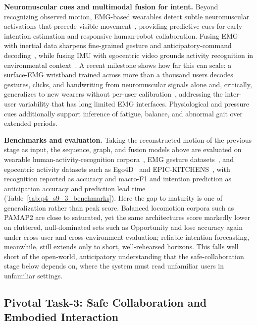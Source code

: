 \textbf{Neuromuscular cues and multimodal fusion for intent.} Beyond recognizing observed motion, EMG-based wearables detect subtle neuromuscular activations that precede visible movement~\cite{atzori2014ninapro}, providing predictive cues for early intention estimation and responsive human-robot collaboration.
Fusing EMG with inertial data sharpens fine-grained gesture and anticipatory-command decoding~\cite{atzori2016deep}, while fusing IMU with egocentric video grounds activity recognition in environmental context~\cite{stein2013combining, grauman2022ego4d}.
A recent milestone shows how far this can scale: a surface-EMG wristband trained across more than a thousand users decodes gestures, clicks, and handwriting from neuromuscular signals alone and, critically, generalizes to new wearers without per-user calibration~\cite{kaifosh2025neuromotor}, addressing the inter-user variability that has long limited EMG interfaces.
Physiological and pressure cues additionally support inference of fatigue, balance, and abnormal gait over extended periods.

\textbf{Benchmarks and evaluation.} Taking the reconstructed motion of the previous stage as input, the sequence, graph, and fusion models above are evaluated on wearable human-activity-recognition corpora~\cite{reiss2012pamap2, chavarriaga2013opportunity}, EMG gesture datasets~\cite{atzori2014ninapro}, and egocentric activity datasets such as Ego4D~\cite{grauman2022ego4d} and EPIC-KITCHENS~\cite{EPIC-KITCHENS}, with recognition reported as accuracy and macro-F1 and intention prediction as anticipation accuracy and prediction lead time (Table~\ref{tab:p4_s9_3_benchmarks}). 
Here the gap to maturity is one of generalization rather than peak score. Balanced locomotion corpora such as PAMAP2 are close to saturated, yet the same architectures score markedly lower on cluttered, null-dominated sets such as Opportunity and lose accuracy again under cross-user and cross-environment evaluation; reliable intention forecasting, meanwhile, still extends only to short, well-rehearsed horizons. This falls well short of the open-world, anticipatory understanding that the safe-collaboration stage below depends on, where the system must read unfamiliar users in unfamiliar settings.


\subsection{Pivotal Task-3: Safe Collaboration and Embodied Interaction}
\label{subsec:p4-sec9-3-pivotal-task-3-safe-collaboration-and-embodied-interaction}

